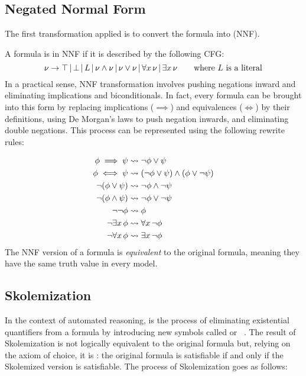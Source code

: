 \subsection{Negated Normal Form}\label{subsec:negated_normal_form}
The first transformation applied is to convert the formula into  (NNF).

A formula is in NNF if it is described by the following CFG\@:
\begin{equation}
  \nu \to \top  \, | \,  \bot  \, | \,  L  \, | \,  \nu \land \nu  \, | \,  \nu \lor \nu  \, | \,  \forall x  \,  \nu  \, | \,  \exists x  \,  \nu \quad\quad \text{where } L \text{ is a literal}
\end{equation}
In a practical sense, NNF transformation involves pushing negations inward and eliminating implications and biconditionals.
In fact, every formula can be brought into this form by replacing implications (\(\implies\)) and equivalences (\(\iff\)) by their definitions, using De Morgan's laws to push negation inwards, and eliminating double negations. This process can be represented using the following rewrite rules:

\begin{equation}
  \begin{aligned}
    \phi \implies \psi &\leadsto \neg \phi \lor \psi \\
    \phi \iff \psi &\leadsto (\neg \phi \lor \psi) \land (\phi \lor \neg \psi) \\
    \neg (\phi \lor \psi) &\leadsto \neg \phi \land \neg \psi \\
    \neg (\phi \land \psi) &\leadsto \neg \phi \lor \neg \psi \\
    \neg \neg \phi &\leadsto \phi \\
    \neg \exists x  \,  \phi &\leadsto \forall x  \,  \neg \phi \\
    \neg \forall x  \,  \phi &\leadsto \exists x  \,  \neg \phi
  \end{aligned}
\end{equation}
The NNF version of a formula is \emph{equivalent} to the original formula, meaning they have the same truth value in every model.

\subsection{Skolemization}\label{subsec:skolemization}
In the context of automated reasoning,  is the process of eliminating existential quantifiers from a formula by introducing new symbols called  or ~\cite{skolem1920}.  
The result of Skolemization is not logically equivalent to the original formula but, relying on the axiom of choice, it is : the original formula is satisfiable if and only if the Skolemized version is satisfiable.
The process of Skolemization goes as follows:

